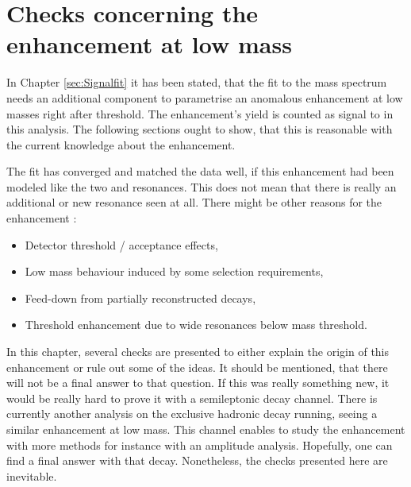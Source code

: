 \chapter{Checks concerning the enhancement at low \Dz\proton mass}
\label{sec:Structure}
In Chapter \ref{sec:Signalfit} it has been stated, that the fit to the \Dz\proton mass spectrum needs an additional component to parametrise an anomalous enhancement at low \Dz\proton masses right after threshold.
The enhancement's yield is counted as signal to \NDp in this analysis.
The following sections ought to show, that this is reasonable with the current knowledge about the enhancement.

The fit has converged and matched the data well, if this enhancement had been modeled like the two \LcResI and \LcResII resonances.
This does not mean that there is really an additional or new resonance seen at all.
There might be other reasons for the enhancement :
\begin{itemize}
    \item Detector threshold / acceptance effects,
    \item Low mass behaviour induced by some selection requirements,
    \item Feed-down from partially reconstructed decays,
    \item Threshold enhancement due to wide resonances below \Dz\proton mass threshold.
\end{itemize}
In this chapter, several checks are presented to either explain the origin of this enhancement or rule out some of the ideas.
It should be mentioned, that there will not be a final answer to that question.
If this was really something new, it would be really hard to prove it with a semileptonic decay channel.
There is currently another \lhcb analysis on the exclusive hadronic decay \decay{\Lb}{\Dz\proton\pim} running, seeing a similar enhancement at low \Dz\proton mass.
This channel enables to study the enhancement with more methods for instance with an amplitude analysis. 
Hopefully, one can find a final answer with that decay.
Nonetheless, the checks presented here are inevitable.


